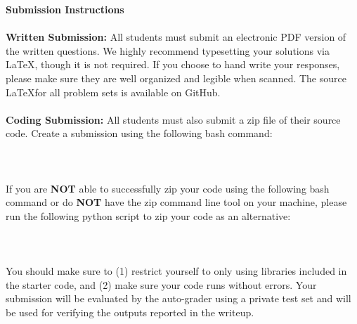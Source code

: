 {\bf Submission Instructions} \\~\\
{\bf Written Submission:}
All students must submit an electronic PDF version of the written questions. We highly recommend typesetting your solutions via \LaTeX, though it is not required. If you choose to hand write your responses, please make sure they are well organized and legible when scanned. The source \LaTeX for all problem sets is available on GitHub.\\~\\
{\bf Coding Submission:}
All students must also submit a zip file of their source code.
Create a submission using the following bash command:\\\\
\small{\zipscript}\\\\ 
If you are \textbf{NOT} able to successfully zip your code using the following bash command or do \textbf{NOT} have the zip command line tool on your machine, please run the following python script to zip your code as an alternative: \\\\
\small{\zipscriptalt}\\\\
You should make sure to (1) restrict yourself to only using libraries included in the starter code, and (2) make sure your code runs without errors.
Your submission will be evaluated by the auto-grader using a private test set and will be used for verifying the outputs reported in the writeup.\\~\\~\\